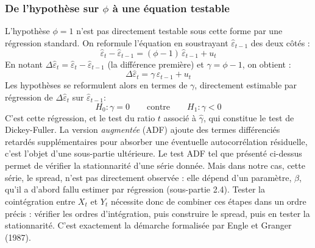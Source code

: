 \documentclass{article}
\begin{document}
\subsubsection*{De l'hypothèse sur $\phi$ à une équation testable}
L'hypothèse $\phi = 1$ n'est pas directement testable sous cette forme par une régression standard. On reformule l'équation en soustrayant $\hat{\varepsilon}_{t-1}$ des deux côtés :
\begin{equation}
\hat{\varepsilon}_t - \hat{\varepsilon}_{t-1} = (\phi - 1)\, \hat{\varepsilon}_{t-1} + u_t
\end{equation}
En notant $\Delta \hat{\varepsilon}_t = \hat{\varepsilon}_t - \hat{\varepsilon}_{t-1}$ (la différence première) et $\gamma = \phi - 1$, on obtient :
\begin{equation}
\Delta \hat{\varepsilon}_t = \gamma\, \hat{\varepsilon}_{t-1} + u_t
\end{equation}
Les hypothèses se reformulent alors en termes de $\gamma$, directement estimable par régression de $\Delta \hat{\varepsilon}_t$ sur $\hat{\varepsilon}_{t-1}$:
\begin{equation}
H_0 : \gamma = 0 \qquad \text{contre} \qquad H_1 : \gamma < 0
\end{equation}
C'est cette régression, et le test du ratio $t$ associé à $\hat\gamma$, qui constitue le test de Dickey-Fuller. La version \emph{augmentée} (ADF) ajoute des termes différenciés retardés supplémentaires pour absorber une éventuelle autocorrélation résiduelle, c'est l'objet d'une sous-partie ultérieure.
Le test ADF tel que présenté ci-dessus permet de vérifier la stationnarité d'une série donnée. Mais dans notre cas, cette série, le spread, n'est pas directement observée : elle dépend d'un paramètre, $\hat\beta$, qu'il a d'abord fallu estimer par régression (sous-partie 2.4). Tester la cointégration entre $X_t$ et $Y_t$ nécessite donc de combiner ces étapes dans un ordre précis : vérifier les ordres d'intégration, puis construire le spread, puis en tester la stationnarité. C'est exactement la démarche formalisée par Engle et Granger (1987).
\end{document}
